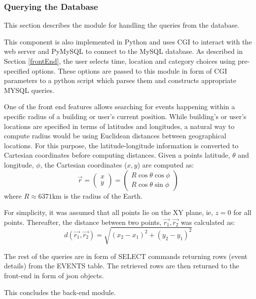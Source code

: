\documentclass{acm_proc_article-sp}
\begin{document}
\subsubsection{Querying the Database}
This section describes the module for handling the queries from the database. 

This component is also implemented in Python and uses CGI to interact with the web server and PyMySQL to connect to the MySQL database. As described in Section \ref{frontEnd}, the user selects time, location and category choices using pre-specified options. These options are passed to this module in form of CGI parameters to a python script which parses them and constructs appropriate MYSQL queries. 

One of the front end features allows searching for events happening within a specific radius of a building or user's current position. While building's or user's locations are specified in terms of latitudes and longitudes, a natural way to compute radius would be using Euclidean distances between geographical locations. For this purpose, the latitude-longitude information is converted to Cartesian coordinates before computing distances. Given  a points latitude, $\theta$ and longitude, $\phi$, the Cartesian coordinates ($x,y$) are computed as:\\
\begin{equation}
\vec{r}=\left(\begin{array}{c}x\\y\end{array}\right)
=
\left(\begin{array}{c}
R\cos\theta\cos\phi
\\
R\cos\theta\sin\phi
\end{array}\right)
\end{equation}
where $R\approx 6371 \mathrm{km}$ is the radius of the Earth. 

For simplicity, it was assumed that all points lie on the XY plane, ie, $z=0$ for all points. Thereafter, the distance between two points, $\vec{r_1},\vec{r_2}$ was calculated as:
\begin{equation}
d(\vec{r_1},\vec{r_2})=\sqrt{(x_2-x_1)^2+(y_2-y_1)^2}
\end{equation}

The rest of the queries are in form of SELECT commands returning rows (event details) from the EVENTS table. The retrieved rows are then returned to the front-end in form of json objects. 

This concludes the back-end module.
\end{document}
